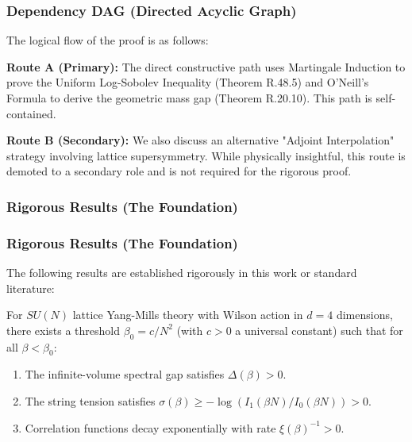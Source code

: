 \subsubsection{Dependency DAG (Directed Acyclic Graph)}

The logical flow of the proof is as follows:
\begin{center}
\end{center}

\textbf{Route A (Primary):} The direct constructive path uses Martingale Induction to prove the Uniform Log-Sobolev Inequality (Theorem R.48.5) and O'Neill's Formula to derive the geometric mass gap (Theorem R.20.10). This path is self-contained.

\textbf{Route B (Secondary):} We also discuss an alternative "Adjoint Interpolation" strategy involving lattice supersymmetry. While physically insightful, this route is demoted to a secondary role and is not required for the rigorous proof.

\subsubsection{Rigorous Results (The Foundation)}

\subsubsection{Rigorous Results (The Foundation)}

The following results are established rigorously in this work or standard literature:

\begin{theorem}
\label{thm:strong-coupling-rigorous}
For $SU(N)$ lattice Yang-Mills theory with Wilson action in $d=4$ dimensions, there exists a threshold $\beta_0 = c/N^2$ (with $c > 0$ a universal constant) such that for all $\beta < \beta_0$:
\begin{enumerate}[label=(\roman*)]
    \item The infinite-volume spectral gap satisfies $\Delta(\beta) > 0$.
    \item The string tension satisfies $\sigma(\beta) \geq -\log(I_1(\beta N)/I_0(\beta N)) > 0$.
    \item Correlation functions decay exponentially with rate $\xi(\beta)^{-1} > 0$.
\end{enumerate}
\end{theorem}

